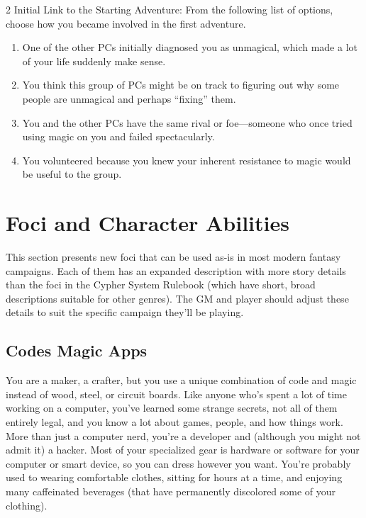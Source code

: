 \begin{multicols}{2}
Initial Link to the Starting Adventure: From the following list of options, choose how you became involved in the first adventure.

\begin{enumerate}
\item One of the other PCs initially diagnosed you as unmagical, which made a lot of your life suddenly make sense.
\item You think this group of PCs might be on track to figuring out why some people are unmagical and perhaps “fixing” them.
\item You and the other PCs have the same rival or foe—someone who once tried using magic on you and failed spectacularly.
\item You volunteered because you knew your inherent resistance to magic would be useful to the group.
\end{enumerate}

\section{Foci and Character Abilities}

This section presents new foci that can be used as-is in most modern fantasy campaigns. Each of them has an expanded description with more story details than the foci in the Cypher System Rulebook (which have short, broad descriptions suitable for other genres). The GM and player should adjust these details to suit the specific campaign they’ll be playing.

\subsection{Codes Magic Apps}

You are a maker, a crafter, but you use a unique combination of code and magic instead of wood, steel, or circuit boards. Like anyone who’s spent a lot of time working on a computer, you’ve learned some strange secrets, not all of them entirely legal, and you know a lot about games, people, and how things work. More than just a computer nerd, you’re a developer and (although you might not admit it) a hacker. Most of your specialized gear is hardware or software for your computer or smart device, so you can dress however you want. You’re probably used to wearing comfortable clothes, sitting for hours at a time, and enjoying many caffeinated beverages (that have permanently discolored some of your clothing).


\end{multicols}
